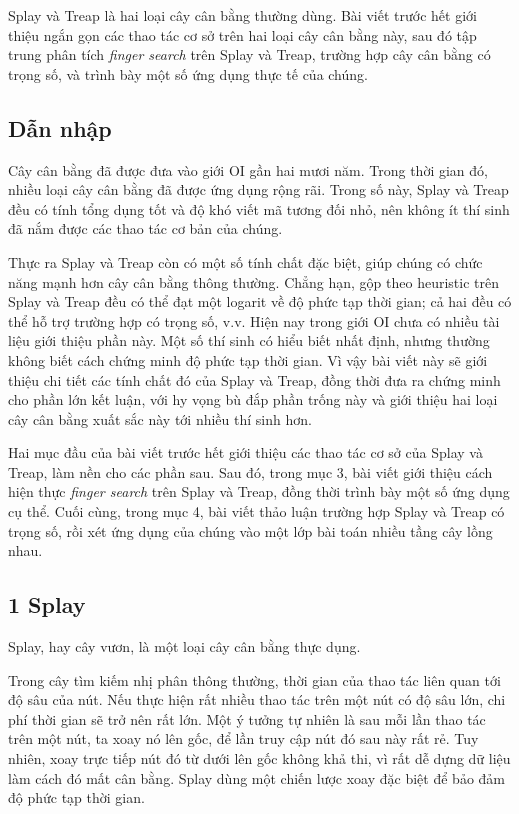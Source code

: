 \documentclass[11pt]{article}
\begin{document}
Splay và Treap là hai loại cây cân bằng thường dùng. Bài viết trước hết giới
thiệu ngắn gọn các thao tác cơ sở trên hai loại cây cân bằng này, sau đó tập
trung phân tích \emph{finger search} trên Splay và Treap, trường hợp cây cân
bằng có trọng số, và trình bày một số ứng dụng thực tế của chúng.

\subsection*{Dẫn nhập}

Cây cân bằng đã được đưa vào giới OI gần hai mươi năm. Trong thời gian đó,
nhiều loại cây cân bằng đã được ứng dụng rộng rãi. Trong số này, Splay và Treap
đều có tính tổng dụng tốt và độ khó viết mã tương đối nhỏ, nên không ít thí
sinh đã nắm được các thao tác cơ bản của chúng.

Thực ra Splay và Treap còn có một số tính chất đặc biệt, giúp chúng có chức
năng mạnh hơn cây cân bằng thông thường. Chẳng hạn, gộp theo heuristic trên
Splay và Treap đều có thể đạt một logarit về độ phức tạp thời gian; cả hai đều
có thể hỗ trợ trường hợp có trọng số, v.v. Hiện nay trong giới OI chưa có nhiều
tài liệu giới thiệu phần này. Một số thí sinh có hiểu biết nhất định, nhưng
thường không biết cách chứng minh độ phức tạp thời gian. Vì vậy bài viết này
sẽ giới thiệu chi tiết các tính chất đó của Splay và Treap, đồng thời đưa ra
chứng minh cho phần lớn kết luận, với hy vọng bù đắp phần trống này và giới
thiệu hai loại cây cân bằng xuất sắc này tới nhiều thí sinh hơn.

Hai mục đầu của bài viết trước hết giới thiệu các thao tác cơ sở của Splay và
Treap, làm nền cho các phần sau. Sau đó, trong mục 3, bài viết giới thiệu cách
hiện thực \emph{finger search} trên Splay và Treap, đồng thời trình bày một số
ứng dụng cụ thể. Cuối cùng, trong mục 4, bài viết thảo luận trường hợp Splay và
Treap có trọng số, rồi xét ứng dụng của chúng vào một lớp bài toán nhiều tầng
cây lồng nhau.

\subsection*{1 Splay}

Splay, hay cây vươn, là một loại cây cân bằng thực dụng.

Trong cây tìm kiếm nhị phân thông thường, thời gian của thao tác liên quan tới
độ sâu của nút. Nếu thực hiện rất nhiều thao tác trên một nút có độ sâu lớn,
chi phí thời gian sẽ trở nên rất lớn. Một ý tưởng tự nhiên là sau mỗi lần thao
tác trên một nút, ta xoay nó lên gốc, để lần truy cập nút đó sau này rất rẻ.
Tuy nhiên, xoay trực tiếp nút đó từ dưới lên gốc không khả thi, vì rất dễ dựng
dữ liệu làm cách đó mất cân bằng. Splay dùng một chiến lược xoay đặc biệt để
bảo đảm độ phức tạp thời gian.
\end{document}
